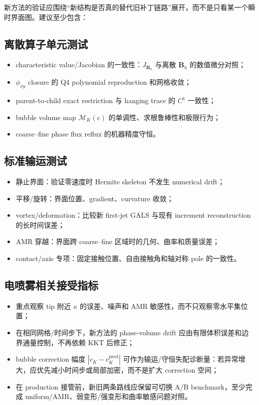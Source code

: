 \documentclass[11pt,a4paper]{ctexart}
\newcommand{\bB}{\bm{B}}
\begin{document}
新方法的验证应围绕“新结构是否真的替代旧补丁链路”展开，而不是只看某一个瞬时界面图。建议至少包含：

\subsection{离散算子单元测试}
\begin{itemize}
    \item characteristic value/Jacobian 的一致性：$J_{\bB_h}$ 与离散 $\bB_h$ 的数值微分对照；
    \item $\phi_{xy}$ closure 的 Q4 polynomial reproduction 和网格收敛；
    \item parent-to-child exact restriction 与 hanging trace 的 $C^1$ 一致性；
    \item bubble volume map $\mathcal M_K(c)$ 的单调性、求根鲁棒性和极限行为；
    \item coarse--fine phase flux reflux 的机器精度守恒。
\end{itemize}

\subsection{标准输运测试}
\begin{itemize}
    \item 静止界面：验证零速度时 Hermite skeleton 不发生 numerical drift；
    \item 平移/旋转：界面位置、gradient、curvature 收敛；
    \item vortex/deformation：比较新 first-jet GALS 与现有 increment reconstruction 的长时间误差；
    \item AMR 穿越：界面跨 coarse--fine 区域时的几何、曲率和质量误差；
    \item contact/axis 专项：固定接触位置、自由接触角和轴对称 pole 的一致性。
\end{itemize}

\subsection{电喷雾相关接受指标}
\begin{itemize}
    \item 重点观察 tip 附近 $\kappa$ 的误差、噪声和 AMR 敏感性，而不只观察零水平集位置；
    \item 在相同网格/时间步下，新方法的 phase-volume drift 应由有限体积误差和边界通量控制，不再依赖 KKT 后修正；
    \item bubble correction 幅度 $|c_K-c_K^{\mathrm{pred}}|$ 可作为输运/守恒失配诊断量：若异常增大，应优先减小时间步或局部加密，而不是扩大 correction 空间；
    \item 在 production 接管前，新旧两条路线应保留可切换 A/B benchmark，至少完成 uniform/AMR、弱变形/强变形和曲率敏感问题对照。
\end{itemize}
\end{document}
